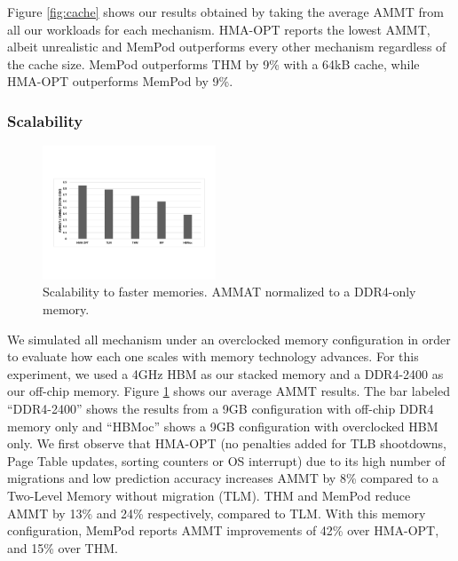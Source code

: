 
Figure \ref{fig:cache} shows our results obtained by taking the average AMMT from all our workloads for each mechanism. HMA-OPT reports the lowest AMMT, albeit unrealistic and MemPod outperforms every other mechanism regardless of the cache size. MemPod outperforms THM by 9\% with a 64kB cache, while HMA-OPT outperforms MemPod by 9\%.

\subsubsection{Scalability}

\begin{figure}
  \includegraphics[width=0.46\textwidth]{figures/scalability.pdf}
  \caption{Scalability to faster memories. AMMAT normalized to a DDR4-only memory.}
  \label{fig:scalability}
\end{figure}

We simulated all mechanism under an overclocked memory configuration in order to evaluate how each one scales with memory technology advances. For this experiment, we used a 4GHz HBM as our stacked memory and a DDR4-2400 as our off-chip memory. Figure \ref{fig:scalability} shows our average AMMT results. The bar labeled ``DDR4-2400'' shows the results from a 9GB configuration with off-chip DDR4 memory only and ``HBMoc'' shows a 9GB configuration with overclocked HBM only. We first observe that HMA-OPT (no penalties added for TLB shootdowns, Page Table updates, sorting counters or OS interrupt) due to its high number of migrations and low prediction accuracy increases AMMT by 8\% compared to a Two-Level Memory without migration (TLM). THM and MemPod reduce AMMT by 13\% and 24\% respectively, compared to TLM. With this memory configuration, MemPod reports AMMT improvements of 42\% over HMA-OPT, and 15\% over THM. 

